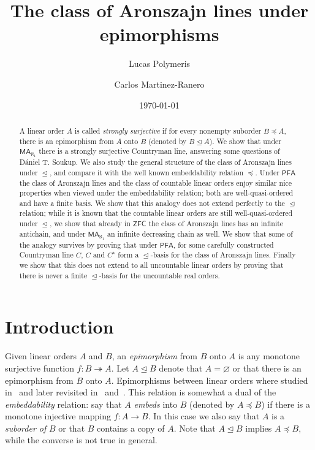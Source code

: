 \documentclass[10pt]{amsart}
\title{The class of Aronszajn lines under epimorphisms}
\author{Lucas Polymeris}
\author{Carlos Martinez-Ranero}
\date{\today}
\theoremstyle{definition}
\theoremstyle{remark}
\newcommand{\es}{\varnothing}
\newcommand{\axiom}[1]{\mathsf{#1}}
\newcommand{\ZFC}{\axiom{ZFC}}
\newcommand{\MA}{\axiom{MA}}
\newcommand{\PFA}{\axiom{PFA}}
\newcommand{\eleq}{\preceq}
\newcommand{\sleq}{\trianglelefteq}
\newcommand{\sur}{\twoheadrightarrow}
\newcommand{\1}{\mathbbm{1}}
\begin{document}
\begin{abstract}
  A linear order $A$ is called \emph{strongly surjective} if for every
  nonempty suborder $B \eleq A$, there is an epimorphism from $A$ onto
  $B$ (denoted by $B \sleq A$). We show that under $\MA_{\aleph_{1}}$
  there is a strongly surjective Countryman line,
  answering some questions of  Dániel T. Soukup.
  We also study the general structure of
  the class of Aronszajn lines under $\sleq$, and compare it with the
  well known embeddability relation $\eleq$. Under
  $\PFA$ the class of Aronszajn lines and the class of countable linear
  orders enjoy similar nice properties when viewed under the
  embeddability relation; both are well-quasi-ordered and have a finite
  basis.  We show that this analogy does not extend perfectly to the
  $\sleq$ relation; while it is known that the countable linear orders
  are still well-quasi-ordered under $\sleq$, we
  show that already in $\ZFC$ the class of Aronszajn lines has an
  infinite antichain, and under $\MA_{\aleph_{1}}$ an infinite
  decreasing chain as well. We show that some of the analogy
  survives by proving that under $\PFA$, for some carefully
  constructed Countryman line $C$, $C$ and $C^{\star}$ form a $\sleq$-basis
  for the class of Aronszajn lines. Finally we show that this does
  not extend to all uncountable linear orders by proving that
  there is never a finite $\sleq$-basis for the uncountable real orders.
\end{abstract}

\maketitle

\section{Introduction}

Given linear orders $A$ and $B$, an \emph{epimorphism} from $B$ onto
$A$ is any monotone surjective function $f : B \sur A$. Let $A \sleq B$
denote that $A = \es$ or that there is an epimorphism from $B$ onto
$A$. Epimorphisms between linear orders where studied
in~\cite{Landraitis} and later revisited in~\cite{CamerloEtAl2015}
and~\cite{CamerloEtAl2019}. This relation is somewhat a dual of the
\emph{embeddability} relation: say that $A$ \emph{embeds}
into $B$ (denoted by $A \eleq B$) if there is a monotone injective
mapping $f : A \to B$. In this case we also say that $A$ is a
\emph{suborder of} $B$ or that $B$ contains a copy of $A$. Note that
$A \sleq B$ implies $A \eleq B$, while the converse is not
true in general.
\end{document}

